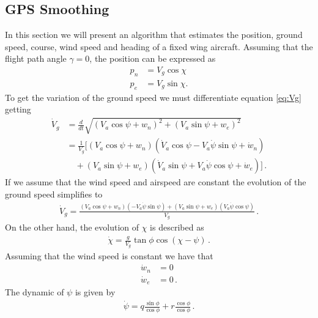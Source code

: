 \subsection{GPS Smoothing}
In this section we will present an algorithm that estimates the position, ground speed, course, wind speed and heading of a fixed wing aircraft. Assuming that the flight path angle $\gamma=0$, the position can be expressed as
\begin{align*}
p_n&=V_g\cos\chi \\
p_e&=V_g\sin\chi.
\end{align*}
To get the variation of the ground speed we must differentiate equation \ref{eq:Vg} getting
\begin{align*}
\dot{V}_g &= \frac{d}{dt}\sqrt{(V_a\cos\psi+w_n)^2+(V_a\sin\psi+w_e)^2} \\
		  &= \frac{1}{V_g}[(V_a\cos\psi+w_n)(\dot{V}_a\cos\psi-V_a\dot{\psi}\sin\psi+\dot{w}_n)\\
		  & \quad +(V_a\sin\psi+w_e)(\dot{V}_a\sin\psi+V_a\dot{\psi}\cos\psi+\dot{w}_e)]\,.
\end{align*}
If we assume that the wind speed and airspeed are constant the evolution of the ground speed simplifies to
\begin{align*}
\dot{V}_g=\frac{(V_a\cos\psi+w_n)(-V_a\dot{\psi}\sin\psi)+(V_a\sin\psi+w_e)(V_a\dot{\psi}\cos\psi)}{V_g}\,.
\end{align*}
On the other hand, the evolution of $\chi$ is described as
\begin{align*}
\dot{\chi}=\frac{g}{V_g}\tan\phi\cos(\chi-\psi)\,.
\end{align*}
Assuming that the wind speed is constant we have that
\begin{align*}
\dot{w}_n&=0 \\
\dot{w}_e&=0\,.
\end{align*}
The dynamic of $\psi$ is given by
\begin{align*}
\dot{\psi}=q\frac{\sin\phi}{\cos\phi}+r\frac{\cos\phi}{\cos\phi}\,.
\end{align*}

